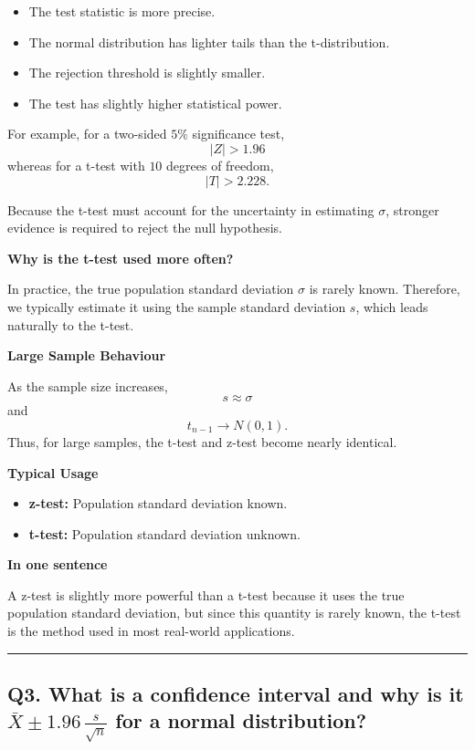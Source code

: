 \documentclass[11pt]{article}
\begin{document}
\begin{itemize}
    \item The test statistic is more precise.
    \item The normal distribution has lighter tails than the t-distribution.
    \item The rejection threshold is slightly smaller.
    \item The test has slightly higher statistical power.
\end{itemize}

For example, for a two-sided \(5\%\) significance test,
\[
|Z| > 1.96
\]
whereas for a t-test with \(10\) degrees of freedom,
\[
|T| > 2.228.
\]

Because the t-test must account for the uncertainty in estimating \(\sigma\), stronger evidence is required to reject the null hypothesis.

\textbf{Why is the t-test used more often?}

In practice, the true population standard deviation \(\sigma\) is rarely known. Therefore, we typically estimate it using the sample standard deviation \(s\), which leads naturally to the t-test.

\textbf{Large Sample Behaviour}

As the sample size increases,
\[
s \approx \sigma
\]
and
\[
t_{n-1} \rightarrow N(0,1).
\]
Thus, for large samples, the t-test and z-test become nearly identical.

\textbf{Typical Usage}

\begin{itemize}
    \item \textbf{z-test:} Population standard deviation known.
    \item \textbf{t-test:} Population standard deviation unknown.
\end{itemize}

\textbf{In one sentence}

A z-test is slightly more powerful than a t-test because it uses the true population standard deviation, but since this quantity is rarely known, the t-test is the method used in most real-world applications.

\vspace{5mm}
\hrule
\vspace{5mm}

\subsection*{Q3. What is a confidence interval and why is it \(\bar X \pm 1.96\,\frac{s}{\sqrt n}\) for a normal distribution?}
\end{document}
